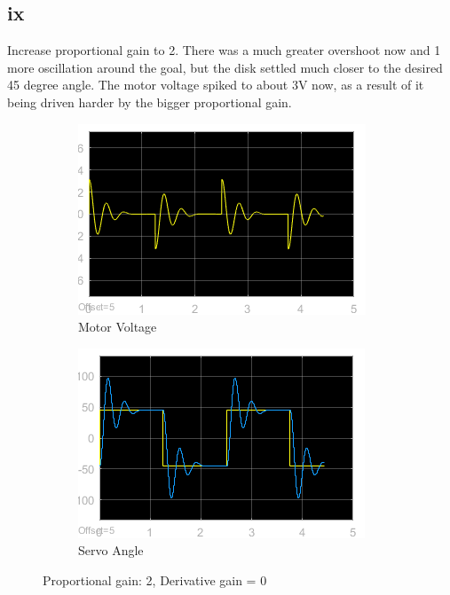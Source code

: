 \documentclass[12pt]{article}
\begin{document}
\subsection*{ix} %
Increase proportional gain to 2. There was a much greater overshoot now and 1 more oscillation around the goal, but the disk settled much closer to the desired 45 degree angle. The motor voltage spiked to about 3V now, as a result of it being driven harder by the bigger proportional gain.
\begin{figure}[h!]
    \centering
    \begin{subfigure}[b]{0.49\textwidth}
        \includegraphics[width=\textwidth]{ix_voltage}
        \caption{Motor Voltage}
    \end{subfigure}
    \begin{subfigure}[b]{0.49\textwidth}
        \includegraphics[width=\textwidth]{ix_angle}
        \caption{Servo Angle}
    \end{subfigure}
    \caption{\label{fig:ix} Proportional gain: 2, Derivative gain = 0}
\end{figure}
\end{document}
